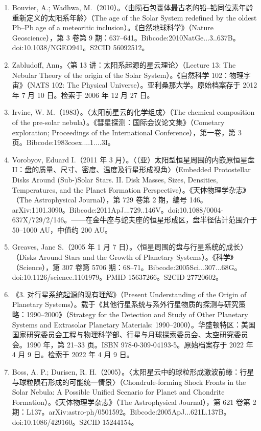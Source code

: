\begin{enumerate}
\item Bouvier, A.; Wadhwa, M.（2010）。〈由陨石包裹体最古老的铅–铅同位素年龄重新定义的太阳系年龄〉（The age of the Solar System redefined by the oldest Pb–Pb age of a meteoritic inclusion）。《自然地球科学》（Nature Geoscience），第 3 卷第 9 期：637–641。Bibcode:2010NatGe...3..637B。doi:10.1038/NGEO941。S2CID 56092512。
\item Zabludoff, Ann。〈第 13 讲：太阳系起源的星云理论〉（Lecture 13: The Nebular Theory of the origin of the Solar System）。《自然科学 102：物理宇宙》（NATS 102: The Physical Universe）。亚利桑那大学。原始档案存于 2012 年 7 月 10 日。检索于 2006 年 12 月 27 日。
\item Irvine, W. M.（1983）。〈太阳前星云的化学组成〉（The chemical composition of the pre-solar nebula）。《彗星探测：国际会议论文集》（Cometary exploration; Proceedings of the International Conference），第一卷，第 3 页。Bibcode:1983coex....1....3I。
\item Vorobyov, Eduard I.（2011 年 3 月）。〈（亚）太阳型恒星周围的内嵌原恒星盘 II：盘的质量、尺寸、密度、温度及行星形成视角〉（Embedded Protostellar Disks Around (Sub-)Solar Stars. II. Disk Masses, Sizes, Densities, Temperatures, and the Planet Formation Perspective）。《天体物理学杂志》（The Astrophysical Journal），第 729 卷第 2 期，编号 146。arXiv:1101.3090。Bibcode:2011ApJ...729..146V。doi:10.1088/0004-637X/729/2/146。——在金牛座与蛇夫座的恒星形成区，盘半径估计范围介于 50–1000 AU，中值约 200 AU。
\item Greaves, Jane S.（2005 年 1 月 7 日）。〈恒星周围的盘与行星系统的成长〉（Disks Around Stars and the Growth of Planetary Systems）。《科学》（Science），第 307 卷第 5706 期：68–71。Bibcode:2005Sci...307...68G。doi:10.1126/science.1101979。PMID 15637266。S2CID 27720602。
\item 《3. 对行星系统起源的现有理解》（Present Understanding of the Origin of Planetary Systems）。载于《其他行星系统与系外行星物质的探测与研究策略：1990–2000》（Strategy for the Detection and Study of Other Planetary Systems and Extrasolar Planetary Materials: 1990–2000）。华盛顿特区：美国国家研究委员会工程与物理科学部、行星与月球探索委员会、太空研究委员会。1990 年，第 21–33 页。ISBN 978-0-309-04193-5。原始档案存于 2022 年 4 月 9 日。检索于 2022 年 4 月 9 日。
\item Boss, A. P.; Durisen, R. H.（2005）。〈太阳星云中的球粒形成激波前缘：行星与球粒陨石形成的可能统一情景〉（Chondrule-forming Shock Fronts in the Solar Nebula: A Possible Unified Scenario for Planet and Chondrite Formation）。《天体物理学杂志》（The Astrophysical Journal），第 621 卷第 2 期：L137。arXiv:astro-ph/0501592。Bibcode:2005ApJ...621L.137B。doi:10.1086/429160。S2CID 15244154。

\end{enumerate}
